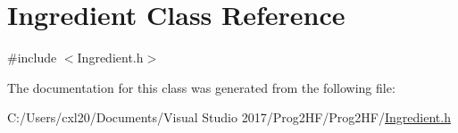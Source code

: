 \hypertarget{class_ingredient}{}\section{Ingredient Class Reference}
\label{class_ingredient}


{\ttfamily \#include $<$Ingredient.\+h$>$}



The documentation for this class was generated from the following file\+:\begin{DoxyCompactItemize}
\item 
C\+:/\+Users/cxl20/\+Documents/\+Visual Studio 2017/\+Prog2\+H\+F/\+Prog2\+H\+F/\mbox{\hyperlink{_ingredient_8h}{Ingredient.\+h}}\end{DoxyCompactItemize}
